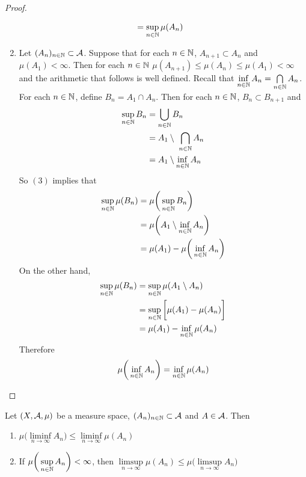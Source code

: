 \documentclass{book}
\begin{document}
\begin{proof}
\begin{enumerate}
\begin{align*}
				&= \sup_{n \in \mathbb{N}} \mu(A_n)
			\end{align*}
			\item Let $(A_n)_{n \in \mathbb{N}} \subset \mathcal{A}$. Suppose that for each $n \in \mathbb{N}$, $ A_{n+1} \subset A_n$ and $\mu(A_1) < \infty$. Then for each $n \in \mathbb{N}$ $\mu(A_{n+1}) \leq \mu(A_n) \leq \mu(A_1) < \infty$ and the arithmetic that follows is well defined. Recall that $\inf\limits_{n \in \mathbb{N}}A_n = \bigcap\limits_{n \in \mathbb{N}}A_n$. For each $n\in \mathbb{N}$, define $B_n = A_1 \cap A_n$. Then for each $n \in \mathbb{N}$, $B_n \subset B_{n+1}$ and
			\begin{align*}
				\sup\limits_{n \in \mathbb{N}}B_n 
				&= \bigcup\limits_{n \in \mathbb{N}}B_n \\
				&= A_1 \setminus \ \bigcap\limits_{n \in \mathbb{N}}A_n \\
				&= A_1 \setminus \inf_{n \in \mathbb{N}}A_n
			\end{align*}  
			So $(3)$ implies that
			\begin{align*}
				\sup_{n \in \mathbb{N}}\mu(B_n) 
				&= \mu \bigg(\sup\limits_{n \in \mathbb{N}}B_n \bigg)\\
				&= \mu \bigg(A_1 \setminus \inf_{n \in \mathbb{N}}A_n \bigg)\\
				&= \mu(A_1) - \mu\bigg(\inf_{n \in \mathbb{N}}A_n \bigg)\\
			\end{align*}
			On the other hand, 
			\begin{align*}
				\sup_{n \in \mathbb{N}}\mu(B_n)
				&= \sup_{n \in \mathbb{N}}\mu(A_1 \setminus A_n)\\
				&= \sup_{n \in \mathbb{N}} \bigg[ \mu(A_1) - \mu(A_n) \bigg]\\
				&= \mu(A_1) - \inf_{n \in \mathbb{N}}\mu(A_n)
			\end{align*}
			Therefore $$\mu\bigg(\inf_{n \in \mathbb{N}}A_n \bigg) = \inf_{n \in \mathbb{N}}\mu(A_n)$$
		\end{enumerate}
	\end{proof}
	
	\begin{ex} 
		Let $(X, \mathcal{A}, \mu)$ be a measure space, $(A_n)_{n \in \mathbb{N}} \subset \mathcal{A}$ and $A \in \mathcal{A}$. Then 
		\begin{enumerate}
			\item $\mu \bigg(\liminf\limits_{n \rightarrow \infty} A_n \bigg) \leq \liminf\limits_{n \rightarrow \infty} \mu(A_n)$
			\item If $\mu\bigg(\sup\limits_{n \in \mathbb{N}}A_n \bigg) < \infty$, then $\limsup\limits_{n \rightarrow \infty}\mu(A_n) \leq \mu \bigg( \limsup\limits_{n \rightarrow \infty}A_n\bigg) $
		\end{enumerate} 
	\end{ex}
	
\end{document}
